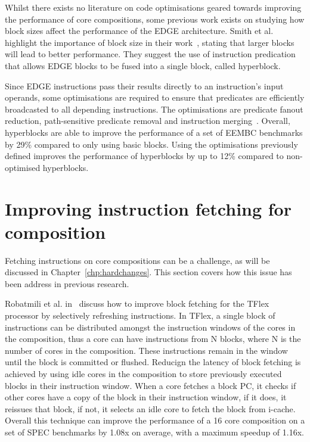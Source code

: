 Whilst there exists no literature on code optimisations geared towards improving the performance of core compositions, some previous work exists on studying how block sizes affect the performance of the EDGE architecture.
Smith et al. highlight the importance of block size in their work~\cite{smith2006edge}, stating that larger blocks will lead to better performance.
They suggest the use of instruction predication~\cite{smith2006dataflowpred} that allows EDGE blocks to be fused into a single block, called hyperblock.

Since EDGE instructions pass their results directly to an instruction's input operands, some optimisations are required to ensure that predicates are efficiently broadcasted to all depending instructions.
The optimisations are predicate fanout reduction, path-sensitive predicate removal and instruction merging~\cite{smith2006dataflowpred}.
Overall, hyperblocks are able to improve the performance of a set of EEMBC benchmarks by 29\% compared to only using basic blocks.
Using the optimisations previously defined improves the performance of hyperblocks by up to 12\% compared to non-optimised hyperblocks.
\vspace{-1em}
\section{Improving instruction fetching for composition}
Fetching instructions on core compositions can be a challenge, as will be discussed in Chapter~\ref{chp:hardchanges}.
This section covers how this issue has been address in previous research.

Robatmili et al. in~\cite{robatmili2011uniproc} discuss how to improve block fetching for the TFlex processor by selectively refreshing instructions.
In TFlex, a single block of instructions can be distributed amongst the instruction windows of the cores in the composition, thus a core can have instructions from N blocks, where N is the number of cores in the composition.
These instructions remain in the window until the block is committed or flushed.
Reducign the latency of block fetching is achieved by using idle cores in the composition to store previously executed blocks in their instruction window.
When a core fetches a block PC, it checks if other cores have a copy of the block in their instruction window, if it does, it reissues that block, if not, it selects an idle core to fetch the block from i-cache.
Overall this technique can improve the performance of a 16 core composition on a set of SPEC benchmarks by 1.08x on average, with a maximum speedup of 1.16x.

